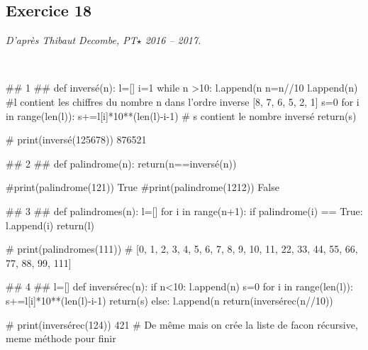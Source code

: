 \documentclass[10pt,fleqn]{article} %
\begin{document}
\subsection*{Exercice 18}
\textit{D'après Thibaut Decombe, PT$\star$ 2016 -- 2017.}
\begin{corrige}
$\quad$
\begin{python}
## 1 ##
def inversé(n):
    l=[]
    i=1
    while n >10:
        l.append(n%
        n=n//10
    l.append(n)
    #l contient les chiffres du nombre n dans l'ordre inverse [8, 7, 6, 5, 2, 1]
    s=0
    for i in range(len(l)):
        s+=l[i]*10**(len(l)-i-1)
    # s contient le nombre inversé
    return(s)

# print(inversé(125678))                   876521

## 2 ##
def palindrome(n):
    return(n==inversé(n))

#print(palindrome(121))   True
#print(palindrome(1212))  False

     
## 3 ##
def palindromes(n):
    l=[]
    for i in range(n+1):
        if palindrome(i) == True:
            l.append(i)
    return(l)

# print(palindromes(111))
# [0, 1, 2, 3, 4, 5, 6, 7, 8, 9, 10, 11, 22, 33, 44, 55, 66, 77, 88, 99, 111]

## 4 ##
l=[]
def inversérec(n):
    if n<10:
        l.append(n)
        s=0
        for i in range(len(l)):
            s+=l[i]*10**(len(l)-i-1)
        return(s)
    else:
        l.append(n%
        return(inversérec(n//10))

# print(inversérec(124))  421    
# De même mais on crée la liste de facon récursive, meme méthode pour finir
\end{python}
\end{corrige}
\end{document}
